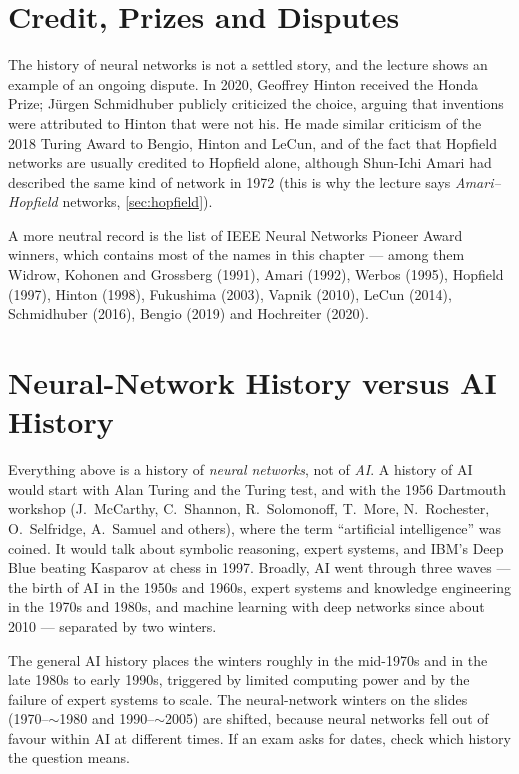 \documentclass[11pt, oneside]{book}
\let\originalsection\section
\renewcommand{\section}{\Needspace{7\baselineskip}\originalsection}
\begin{document}
\section{Credit, Prizes and Disputes}

The history of neural networks is not a settled story, and the lecture shows
an example of an ongoing dispute. In 2020, Geoffrey Hinton received the
Honda Prize; J\"urgen Schmidhuber publicly criticized the choice, arguing
that inventions were attributed to Hinton that were not his. He made similar
criticism of the 2018 Turing Award to Bengio, Hinton and LeCun, and of the
fact that Hopfield networks are usually credited to Hopfield alone, although
Shun-Ichi Amari had described the same kind of network in 1972 (this is why
the lecture says \emph{Amari--Hopfield} networks, \cref{sec:hopfield}).

A more neutral record is the list of IEEE Neural Networks Pioneer Award
winners, which contains most of the names in this chapter --- among them
Widrow, Kohonen and Grossberg (1991), Amari (1992), Werbos (1995), Hopfield
(1997), Hinton (1998), Fukushima (2003), Vapnik (2010), LeCun (2014),
Schmidhuber (2016), Bengio (2019) and Hochreiter (2020).

\section{Neural-Network History versus AI History}

Everything above is a history of \emph{neural networks}, not of \emph{AI}. A
history of AI would start with Alan Turing and the Turing test, and with the
1956 Dartmouth workshop (J.~McCarthy, C.~Shannon, R.~Solomonoff, T.~More,
N.~Rochester, O.~Selfridge, A.~Samuel and others), where the term
``artificial intelligence'' was coined. It would talk about symbolic
reasoning, expert systems, and IBM's Deep Blue beating Kasparov at chess in
1997. Broadly, AI went through three waves --- the birth of AI in the 1950s
and 1960s, expert systems and knowledge engineering in the 1970s and 1980s,
and machine learning with deep networks since about 2010 --- separated by two
winters.

\begin{notebox}[title={Two different sets of ``AI winter'' dates}]
The general AI history places the winters roughly in the mid-1970s and in
the late 1980s to early 1990s, triggered by limited computing power and by
the failure of expert systems to scale. The neural-network winters on the
slides (1970--$\sim$1980 and 1990--$\sim$2005) are shifted, because neural
networks fell out of favour within AI at different times. If an exam asks
for dates, check which history the question means.
\end{notebox}
\end{document}
